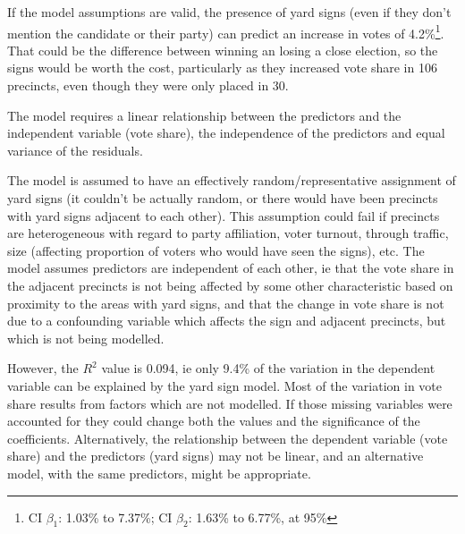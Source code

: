 \documentclass[12pt,letterpaper]{article}
\begin{document}
\begin{enumerate}

  If the model assumptions are valid, the presence of yard signs (even if they don't mention the candidate or their party) can predict an increase in votes of 4.2\%\footnote{CI $\beta_1$: 1.03\% to 7.37\%;  CI $\beta_2$: 1.63\% to 6.77\%, at 95\%}.  That could be the difference between winning an losing a close election, so the signs would be worth the cost, particularly as they increased vote share in 106 precincts, even though they were only placed in 30.

The model requires a linear relationship between the predictors and the independent variable (vote share), the independence of the predictors and equal variance of the residuals. 

The model is assumed to have an effectively random/representative assignment of yard signs (it couldn't be actually random, or there would have been precincts with yard signs adjacent to each other).  This assumption could fail if precincts are heterogeneous with regard to party affiliation, voter turnout, through traffic, size (affecting proportion of voters who would have seen the signs), etc.
The model assumes predictors are independent of each other, ie that the vote share in the adjacent precincts is not being affected by some other characteristic based on proximity to the areas with yard signs, and that the change in vote share is not due to a confounding variable which affects the sign and adjacent precincts, but which is not being modelled.

  However, the $R^2$ value is 0.094, ie only 9.4\% of the variation in the dependent variable can be explained by the yard sign model.  Most of the variation in vote share results from factors which are not modelled.  If those missing variables were accounted for they could change both the values and the significance of the coefficients.   Alternatively, the relationship between the dependent variable (vote share) and the predictors (yard signs) may not be linear, and an alternative model, with the same predictors, might be appropriate.

  
\end{enumerate}  
\end{document}
